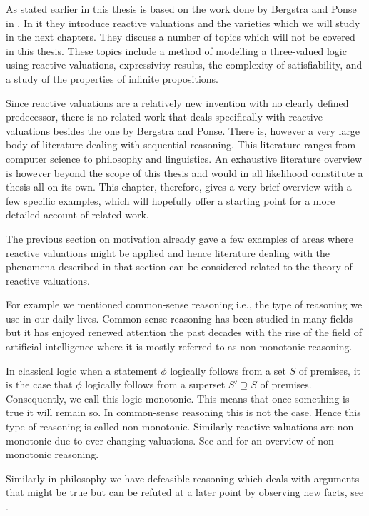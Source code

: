 \documentclass[a4paper,twoside,openright]{report}
\begin{document}
As stated earlier in this thesis is based on the work done by Bergstra and Ponse in \cite{main}. In it they introduce reactive valuations and the varieties which we will study in the next chapters. They discuss a number of topics which will not be covered in this thesis. These topics include a method of modelling a three-valued logic using reactive valuations, expressivity results, the complexity of satisfiability, and a study of the properties of infinite propositions.

Since reactive valuations are a relatively new invention with no clearly defined predecessor, there is no related work that deals specifically with reactive valuations besides the one by Bergstra and Ponse. There is, however a very large body of literature dealing with sequential reasoning. This literature ranges from computer science to philosophy and linguistics. An exhaustive literature overview is however beyond the scope of this thesis and would in all likelihood constitute a thesis all on its own. This chapter, therefore, gives a very brief overview with a few specific examples, which will hopefully offer a starting point for a more detailed account of related work.

The previous section on motivation already gave a few examples of areas where reactive valuations might be applied and hence literature dealing with the phenomena described in that section can be considered related to the theory of reactive valuations.

For example we mentioned common-sense reasoning i.e., the type of reasoning we use in our daily lives. Common-sense reasoning has been studied in many fields but it has enjoyed renewed attention the past decades with the rise of the field of artificial intelligence where it is mostly referred to as non-monotonic reasoning.

In classical logic when a statement $\phi$ logically follows from a set $S$ of premises, it is the case that $\phi$ logically follows from a superset $S'\supseteq S$ of premises. Consequently, we call this logic monotonic. This means that once something is true it will remain so. In common-sense reasoning this is not the case. Hence this type of reasoning is called non-monotonic. Similarly reactive valuations are non-monotonic due to ever-changing valuations. See \cite{non-monotonic} and \cite{non-monotonic2} for an overview of non-monotonic reasoning.

Similarly in philosophy we have defeasible reasoning which deals with arguments that might be true but can be refuted at a later point by observing new facts, see \cite{defeasible}.
\end{document}
